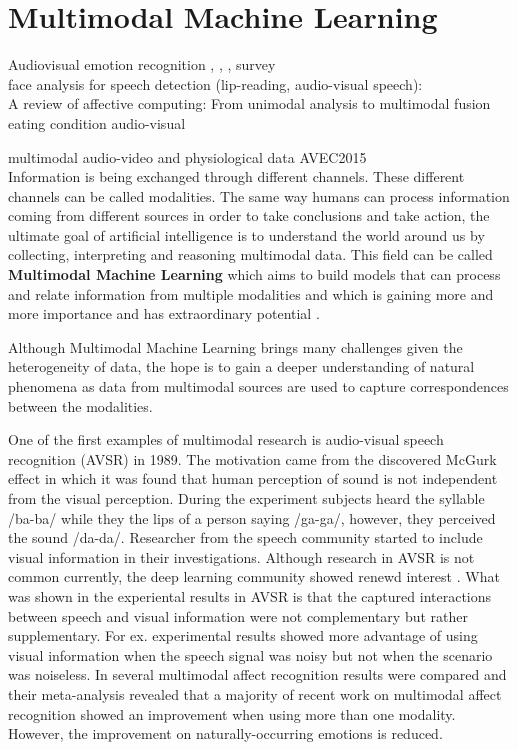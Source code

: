 \section{Multimodal Machine Learning}

Audiovisual emotion recognition \cite{Chao2016}, \cite{Corneanu2016survey}, \cite{Nicolle2012}, survey \cite{Zeng2009survey}\\

face analysis for speech detection (lip-reading, audio-visual speech):\\

A review of affective computing: From unimodal analysis to multimodal fusion\cite{Poria2017}\\

 eating condition audio-visual\cite{Schuller2015interspeech}

multimodal audio-video and physiological data AVEC2015 \cite{Ringeval2015}\\


Information is being exchanged through different channels. These different channels can be called modalities. The same way humans can process information coming from different sources in order to take conclusions and take action, the ultimate goal of artificial intelligence is to understand the world around us by collecting, interpreting and reasoning multimodal data. This field can be called \textbf{Multimodal Machine Learning} which aims to build models that can process and relate information from multiple modalities and which is gaining more and more importance and has extraordinary potential \cite{Baltruvsaitis2017multimodal}.

Although Multimodal Machine Learning brings many challenges given the heterogeneity of data, the hope is to gain a deeper understanding of natural phenomena as data from multimodal sources are used to capture correspondences between the modalities.

One of the first examples of multimodal research is audio-visual speech recognition (AVSR) in 1989. The motivation came from the discovered McGurk effect in which it was found that human perception of sound is not independent from the visual perception. During the experiment subjects heard the syllable /ba-ba/ while they the lips of a person saying /ga-ga/, however, they perceived the sound /da-da/. Researcher from the speech community started to include visual information in their investigations. Although research in AVSR is not common currently, the deep learning community showed renewd interest \cite{Ngiam2011}. What was shown in the experiental results in AVSR is that the captured interactions between speech and visual information were not complementary but rather supplementary. For ex. experimental results showed more advantage of using visual information when the speech signal was noisy but not when the scenario was noiseless.
In \cite{Dmello2015review} several multimodal affect recognition results were compared and their meta-analysis revealed that a majority of recent work on multimodal affect recognition showed an improvement when using more than one modality. However, the improvement on naturally-occurring emotions is reduced. 


